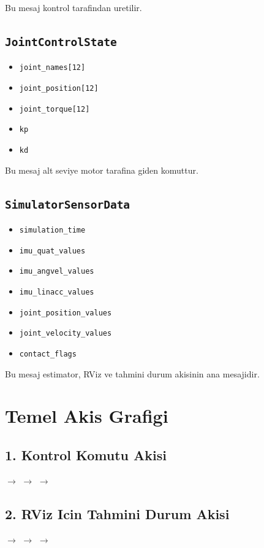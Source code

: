 \documentclass[11pt]{article}
\begin{document}
Bu mesaj kontrol tarafindan uretilir.

\subsection*{\texttt{JointControlState}}
\begin{itemize}
  \item \texttt{joint\_names[12]}
  \item \texttt{joint\_position[12]}
  \item \texttt{joint\_torque[12]}
  \item \texttt{kp}
  \item \texttt{kd}
\end{itemize}

Bu mesaj alt seviye motor tarafina giden komuttur.

\subsection*{\texttt{SimulatorSensorData}}
\begin{itemize}
  \item \texttt{simulation\_time}
  \item \texttt{imu\_quat\_values}
  \item \texttt{imu\_angvel\_values}
  \item \texttt{imu\_linacc\_values}
  \item \texttt{joint\_position\_values}
  \item \texttt{joint\_velocity\_values}
  \item \texttt{contact\_flags}
\end{itemize}

Bu mesaj estimator, RViz ve tahmini durum akisinin ana mesajidir.

\section*{Temel Akis Grafigi}
\subsection*{1. Kontrol Komutu Akisi}
\begin{center}
$\rightarrow$
$\rightarrow$
$\rightarrow$
\end{center}

\subsection*{2. RViz Icin Tahmini Durum Akisi}
\begin{center}
$\rightarrow$
$\rightarrow$
$\rightarrow$
\end{center}
\end{document}
